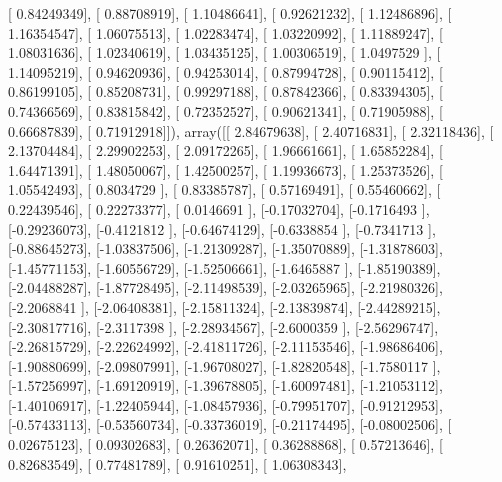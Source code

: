 \documentclass{article}
\begin{document}
       [ 0.84249349],
       [ 0.88708919],
       [ 1.10486641],
       [ 0.92621232],
       [ 1.12486896],
       [ 1.16354547],
       [ 1.06075513],
       [ 1.02283474],
       [ 1.03220992],
       [ 1.11889247],
       [ 1.08031636],
       [ 1.02340619],
       [ 1.03435125],
       [ 1.00306519],
       [ 1.0497529 ],
       [ 1.14095219],
       [ 0.94620936],
       [ 0.94253014],
       [ 0.87994728],
       [ 0.90115412],
       [ 0.86199105],
       [ 0.85208731],
       [ 0.99297188],
       [ 0.87842366],
       [ 0.83394305],
       [ 0.74366569],
       [ 0.83815842],
       [ 0.72352527],
       [ 0.90621341],
       [ 0.71905988],
       [ 0.66687839],
       [ 0.71912918]]), array([[ 2.84679638],
       [ 2.40716831],
       [ 2.32118436],
       [ 2.13704484],
       [ 2.29902253],
       [ 2.09172265],
       [ 1.96661661],
       [ 1.65852284],
       [ 1.64471391],
       [ 1.48050067],
       [ 1.42500257],
       [ 1.19936673],
       [ 1.25373526],
       [ 1.05542493],
       [ 0.8034729 ],
       [ 0.83385787],
       [ 0.57169491],
       [ 0.55460662],
       [ 0.22439546],
       [ 0.22273377],
       [ 0.0146691 ],
       [-0.17032704],
       [-0.1716493 ],
       [-0.29236073],
       [-0.4121812 ],
       [-0.64674129],
       [-0.6338854 ],
       [-0.7341713 ],
       [-0.88645273],
       [-1.03837506],
       [-1.21309287],
       [-1.35070889],
       [-1.31878603],
       [-1.45771153],
       [-1.60556729],
       [-1.52506661],
       [-1.6465887 ],
       [-1.85190389],
       [-2.04488287],
       [-1.87728495],
       [-2.11498539],
       [-2.03265965],
       [-2.21980326],
       [-2.2068841 ],
       [-2.06408381],
       [-2.15811324],
       [-2.13839874],
       [-2.44289215],
       [-2.30817716],
       [-2.3117398 ],
       [-2.28934567],
       [-2.6000359 ],
       [-2.56296747],
       [-2.26815729],
       [-2.22624992],
       [-2.41811726],
       [-2.11153546],
       [-1.98686406],
       [-1.90880699],
       [-2.09807991],
       [-1.96708027],
       [-1.82820548],
       [-1.7580117 ],
       [-1.57256997],
       [-1.69120919],
       [-1.39678805],
       [-1.60097481],
       [-1.21053112],
       [-1.40106917],
       [-1.22405944],
       [-1.08457936],
       [-0.79951707],
       [-0.91212953],
       [-0.57433113],
       [-0.53560734],
       [-0.33736019],
       [-0.21174495],
       [-0.08002506],
       [ 0.02675123],
       [ 0.09302683],
       [ 0.26362071],
       [ 0.36288868],
       [ 0.57213646],
       [ 0.82683549],
       [ 0.77481789],
       [ 0.91610251],
       [ 1.06308343],
\end{document}
